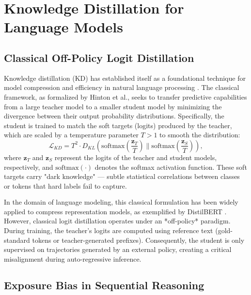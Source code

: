 \section{Knowledge Distillation for Language Models}

\subsection{Classical Off-Policy Logit Distillation}

Knowledge distillation (KD) has established itself as a foundational technique for model compression and efficiency in natural language processing \parencite{hinton2015distillingknowledgeneuralnetwork}. The classical framework, as formalized by Hinton et al., seeks to transfer predictive capabilities from a large teacher model to a smaller student model by minimizing the divergence between their output probability distributions. Specifically, the student is trained to match the soft targets (logits) produced by the teacher, which are scaled by a temperature parameter $T > 1$ to smooth the distribution:
\begin{equation}
    \mathcal{L}_{KD} = T^2 \cdot D_{KL}\left(\mathrm{softmax}\left(\frac{\mathbf{z}_T}{T}\right) \parallel \mathrm{softmax}\left(\frac{\mathbf{z}_S}{T}\right)\right),
\end{equation}
where $\mathbf{z}_T$ and $\mathbf{z}_S$ represent the logits of the teacher and student models, respectively, and $\mathrm{softmax}(\cdot)$ denotes the softmax activation function. These soft targets carry "dark knowledge" --- subtle statistical correlations between classes or tokens that hard labels fail to capture. 

In the domain of language modeling, this classical formulation has been widely applied to compress representation models, as exemplified by DistilBERT \parencite{sanh2020distilbertdistilledversionbert}. However, classical logit distillation operates under an *off-policy* paradigm. During training, the teacher's logits are computed using reference text (gold-standard tokens or teacher-generated prefixes). Consequently, the student is only supervised on trajectories generated by an external policy, creating a critical misalignment during auto-regressive inference.

\subsection{Exposure Bias in Sequential Reasoning}

